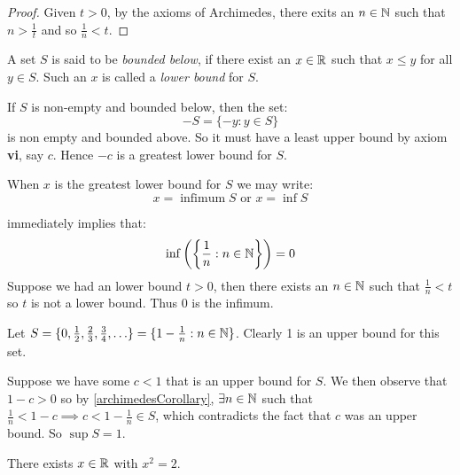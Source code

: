 \documentclass[../main.tex]{subfiles}
\begin{document}
\begin{proof}
  Given $t > 0$, by the axioms of Archimedes, there exits an $n \in \mathbb{N}$ such that $n > \frac{1}{t}$ and so $\frac{1}{n} < t$.
\end{proof}
\begin{definition}
  A set $S$ is said to be \textit{bounded below}, if there exist an $x \in \mathbb{R}$ such that $x \leq y$ for all $y \in S$.
  Such an $x$ is called a \textit{lower bound} for $S$.
\end{definition}
If $S$ is non-empty and bounded below, then the set:
\[
  -S = \{-y: y \in S\}
\]
is non empty and bounded above.
So it must have a least upper bound by axiom \textbf{vi}, say $c$.
Hence $-c$ is a greatest lower bound for $S$.
\begin{remark}[Notation]
  When $x$ is the greatest lower bound for $S$ we may write:
  \[
    x = \operatorname{infimum} S \text{ or } x = \inf S
  \]
\end{remark}
 immediately implies that:
\[
  \inf\left(\left\{\frac{1}{n}: n \in \mathbb{N}\right\}\right) = 0
\]
Suppose we had an lower bound $t > 0$, then there exists an $n \in \mathbb{N}$ such that $\frac{1}{n} < t$ so $t$ is not a lower bound.
Thus 0 is the infimum.
\begin{example}
  Let $S = \{0, \frac{1}{2}, \frac{2}{3}, \frac{3}{4}, \ldots\} = \{1 - \frac{1}{n}: n \in \mathbb{N}\}$.
  Clearly 1 is an upper bound for this set.

  Suppose we have some $c < 1$ that is an upper bound for $S$.
  We then observe that $1 - c > 0$ so by \cref{archimedesCorollary}, $\exists n \in \mathbb{N}$ such that $\frac{1}{n} < 1 - c \implies c < 1 - \frac{1}{n} \in S$, which contradicts the fact that $c$ was an upper bound.
  So $\sup S = 1$.
\end{example}
\begin{theorem}
  There exists $x \in \mathbb{R}$ with $x^2 = 2$.
\end{theorem}
\end{document}
